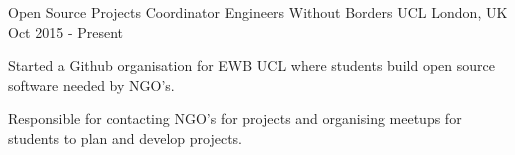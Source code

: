 \begin{cventries}
\cventry
  {Open Source Projects Coordinator}
  {Engineers Without Borders UCL}
  {London, UK}
  {Oct 2015 - Present}
  {
    \begin{cvitems}
      \item {Started a Github organisation for EWB UCL where students build open source software needed by NGO's.}
      \item {Responsible for contacting NGO's for projects and organising meetups for students to plan and develop projects.}
    \end{cvitems}
  }

\end{cventries}
